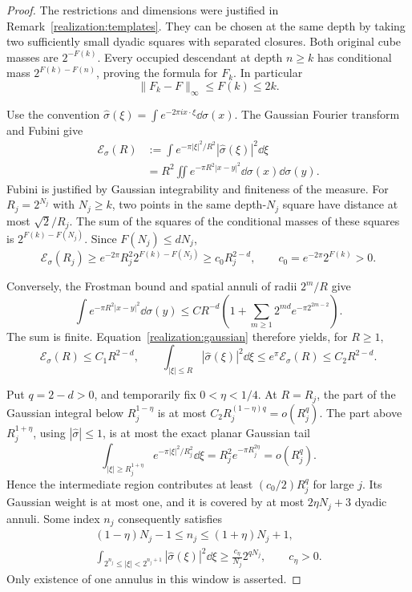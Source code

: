 \begin{proof}
The restrictions and dimensions were justified in
Remark~\ref{realization:templates}. They can be chosen at the same depth
by taking two sufficiently small dyadic squares with separated closures.
Both original cube masses are \(2^{-F(k)}\). Every occupied descendant
at depth \(n\ge k\) has conditional mass \(2^{F(k)-F(n)}\),
proving the formula for \(F_k\). In particular
\begin{equation}\label{realization:conditional-error}
 \|F_k-F\|_\infty\le F(k)\le2k.
\end{equation}

Use the convention \(\widehat\sigma(\xi)=\int e^{-2\pi i x\cdot\xi}
\dd\sigma(x)\). The Gaussian Fourier transform and Fubini give
\begin{align}
 \mathcal E_\sigma(R)
 &:=\int e^{-\pi|\xi|^2/R^2}|\widehat\sigma(\xi)|^2\dd\xi
 \nonumber\\
 &=R^2\iint e^{-\pi R^2|x-y|^2}\dd\sigma(x)\dd\sigma(y).
 \label{realization:gaussian}
\end{align}
Fubini is justified by Gaussian integrability and finiteness of the measure.
For \(R_j=2^{N_j}\) with \(N_j\ge k\), two points in the same depth-\(N_j\) square
have distance at most \(\sqrt2/R_j\). The sum of the squares of the
conditional masses of these squares is \(2^{F(k)-F(N_j)}\).
Since \(F(N_j)\le dN_j\),
\begin{equation}\label{realization:energy-lower}
 \mathcal E_\sigma(R_j)\ge e^{-2\pi}R_j^2 2^{F(k)-F(N_j)}
 \ge c_0R_j^{2-d},\qquad c_0=e^{-2\pi}2^{F(k)}>0.
\end{equation}

Conversely, the Frostman bound and spatial annuli of radii \(2^m/R\)
give
\[
 \int e^{-\pi R^2|x-y|^2}\dd\sigma(y)
 \le CR^{-d}\left(1+\sum_{m\ge1}2^{md}e^{-\pi2^{2m-2}}\right).
\]
The sum is finite. Equation~\eqref{realization:gaussian} therefore yields,
for \(R\ge1\),
\begin{equation}\label{realization:energy-upper}
 \mathcal E_\sigma(R)\le C_1R^{2-d},\qquad
 \int_{|\xi|\le R}|\widehat\sigma(\xi)|^2\dd\xi
 \le e^\pi\mathcal E_\sigma(R)\le C_2R^{2-d}.
\end{equation}

Put \(q=2-d>0\), and temporarily fix \(0<\eta<1/4\).
At \(R=R_j\), the part of the Gaussian integral below
\(R_j^{1-\eta}\) is at most \(C_2R_j^{(1-\eta)q}=o(R_j^q)\).
The part above \(R_j^{1+\eta}\), using
\(|\widehat\sigma|\le1\), is at most the exact planar Gaussian tail
\[
 \int_{|\xi|\ge R_j^{1+\eta}}e^{-\pi|\xi|^2/R_j^2}\dd\xi
 =R_j^2e^{-\pi R_j^{2\eta}}=o(R_j^q).
\]
Hence the intermediate region contributes at least
\((c_0/2)R_j^q\) for large \(j\). Its Gaussian weight is at most one,
and it is covered by at most \(2\eta N_j+3\) dyadic annuli.
Some index \(n_j\) consequently satisfies
\begin{gather}
 (1-\eta)N_j-1\le n_j\le(1+\eta)N_j+1,
 \label{realization:nearby-annulus}\\
 \int_{2^{n_j}\le|\xi|<2^{n_j+1}}|\widehat\sigma(\xi)|^2\dd\xi
 \ge\frac{c_\eta}{N_j}2^{qN_j},\qquad c_\eta>0.
 \label{realization:annular-lower}
\end{gather}
Only existence of one annulus in this window is asserted.


\end{proof}
